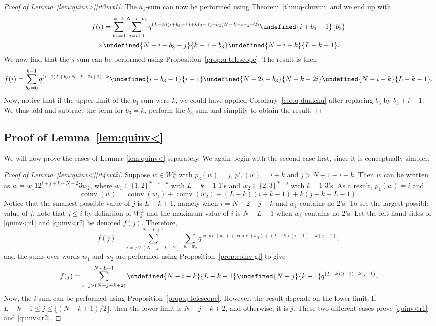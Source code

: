 \documentclass[11pt]{article}
\theoremstyle{definition}
\providecommand{\qbinom}[2]{\genfrac{[}{]}{0pt}{}{#1}{#2}}
\numberwithin{equation}{section}
\DeclareMathOperator{\coinv}{coinv}
\let\qbinom\undefined
\newcommand{\qbinom}[2]{\bgroup\renewcommand*{\arraystretch}{1}\begin{bmatrix} #1 \\ #2\end{bmatrix} \egroup}
\begin{document}
\begin{proof}[Proof of Lemma~\ref{lem:quinv>}\ref{it3vvt1}]
The $a_1$-sum can now be performed using Theorem~\ref{thm:q-chuvan} and we end up with
\begin{multline*}
f(i) = \sum_{b_3 = 0}^{k-1}   \sum_{j=i+1}^{N-i-b_3} q^{(L-k)(i+b_3-1) + k(j-1) + b_3(N-L-i-j+2)} \qbinom{i+b_3-1}{b_3} \\
\times \qbinom {N-i-b_3-j}{k-1-b_3}  \qbinom {N-i-k}{L-k-1} .
\end{multline*}
We now find that the $j$-sum can be performed using Proposition~\ref{prop:q-telescope}.  The result is then
\[
f(i) = \sum_{b_3 = 0}^{k-1}  q^{(i-1)L + b_3(N-k-2i+1) + k} 
\qbinom{i+b_3-1}{i-1} \qbinom {N-2i-b_3}{N-k-2i} 
\qbinom {N-i-k}{L-k-1} .
\]
Now, notice that if the upper limit of the $b_3$-sum were $k$, we could have applied
Corollary~\ref{cor:q-dualchu} after replacing $b_3$ by $b_3+i-1$.  We thus add and subtract 
the term for $b_3 = k$, perform the $b_3$-sum and simplify to obtain the result.
\end{proof}



\subsection{Proof of Lemma~\ref{lem:quinv<}}
We will now prove the cases of Lemma~\ref{lem:quinv<} separately.
We again begin with the second case first, since it is conceptually simpler.


\begin{proof}[Proof of Lemma~\ref{lem:quinv<}\ref{it4vvt2}]
Suppose $w \in  W_k^\leq$ with $p_3(w) = j$, $p'_1(w) = i+k$ and $j > N+1 - i-k$. Then
$w$ can be written as $w = w_1 1 2^{i+j+k-N-2} 3 w_2$, where $w_1 \in \{1,2\}^{N-i-k}$ with $L-k-1$ $1$'s
and $w_2 \in \{2,3\}^{N-j}$ with $k-1$ $3$'s. As a result, $p_1(w) = i$ and
\[
\coinv(w) = \coinv(w_1) + \coinv(w_2) + (L-k)(i+k-1) + k(j+k-L-1).
\]
Notice that the smallest possible value of $j$ is $L-k+1$, namely when $i = N+2-j-k$ and $w_1$ contains no $2$'s. To see the  largest possible value of $j$,  note that $j \leq i$ by definition of $W_k^\leq$ and the maximum value of $i$ is $N-L+1$ when $w_1$ contains no $2$'s. Let the left hand sides of \eqref{quinv<r1} and \eqref{quinv<r2} be denoted $f(j)$.
Therefore,
\[
f(j) = \sum_{i=j \vee (N-j-k+2)}^{N-L+1}\ \sum_{w_1,w_2} q^{\coinv(w_1) + \coinv(w_2) + (L-k)(i-1) + k(j-1)},
\]
and the sums over words $w_1$ and $w_2$ are performed using Proposition~\ref{prop:coinv-gf} to give
\[
f(j) = \sum_{i=j \vee (N-j-k+2)}^{N-L+1} \qbinom {N-i-k}{L-k-1} \qbinom{N-j}{k-1} q^{ (L-k)(i-1) + k(j-1)}.
\]
Now, the $i$-sum can be performed using Proposition~\ref{prop:q-telescope}. However, the result depends on 
the lower limit. If $L-k+1 \leq j \leq \lfloor (N-k+1)/2 \rfloor$, then the lower limit is $N-j-k+2$, and otherwise,
it is $j$. These two different cases prove \eqref{quinv<r1} and \eqref{quinv<r2}.
\end{proof}
\end{document}
